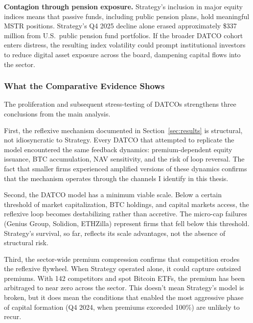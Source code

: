\textbf{Contagion through pension exposure.} Strategy's inclusion in major equity indices means that passive funds, including public pension plans, hold meaningful MSTR positions. Strategy's Q4 2025 decline alone erased approximately \$337 million from U.S.\ public pension fund portfolios. If the broader DATCO cohort enters distress, the resulting index volatility could prompt institutional investors to reduce digital asset exposure across the board, dampening capital flows into the sector.

\subsubsection{What the Comparative Evidence Shows}

The proliferation and subsequent stress-testing of DATCOs strengthens three conclusions from the main analysis.

First, the reflexive mechanism documented in Section~\ref{sec:results} is structural, not idiosyncratic to Strategy. Every DATCO that attempted to replicate the model encountered the same feedback dynamics: premium-dependent equity issuance, BTC accumulation, NAV sensitivity, and the risk of loop reversal. The fact that smaller firms experienced amplified versions of these dynamics confirms that the mechanism operates through the channels I identify in this thesis.

Second, the DATCO model has a minimum viable scale. Below a certain threshold of market capitalization, BTC holdings, and capital markets access, the reflexive loop becomes destabilizing rather than accretive. The micro-cap failures (Genius Group, Solidion, ETHZilla) represent firms that fell below this threshold. Strategy's survival, so far, reflects its scale advantages, not the absence of structural risk.

Third, the sector-wide premium compression confirms that competition erodes the reflexive flywheel. When Strategy operated alone, it could capture outsized premiums. With 142 competitors and spot Bitcoin ETFs, the premium has been arbitraged to near zero across the sector. This doesn't mean Strategy's model is broken, but it does mean the conditions that enabled the most aggressive phase of capital formation (Q4 2024, when premiums exceeded 100\%) are unlikely to recur.
